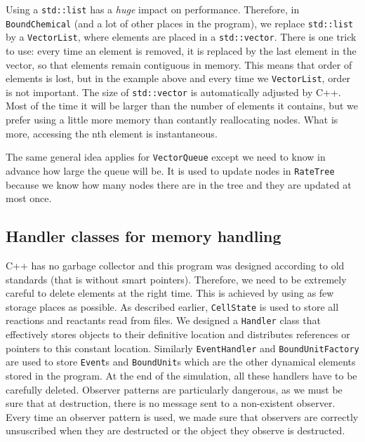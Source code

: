 Using a \texttt{std::list} has a \emph{huge} impact on performance. Therefore, in \texttt{BoundChemical} (and a lot of other places in the program), we replace \texttt{std::list} by a \texttt{VectorList}, where elements are placed in a \texttt{std::vector}. There is one trick to use: every time an element is removed, it is replaced by the last element in the vector, so that elements remain contiguous in memory. This means that order of elements is lost, but in the example above and every time we \texttt{VectorList}, order is not important. The size of \texttt{std::vector} is automatically adjusted by C++. Most of the time it will be larger than the number of elements it contains, but we prefer using a little more memory than contantly reallocating nodes. What is more, accessing the nth element is instantaneous.

The same general idea applies for \texttt{VectorQueue} except we need to know in advance how large the queue will be. It is used to update nodes in \texttt{RateTree} because we know how many nodes there are in the tree and they are updated at most once.

\subsection{Handler classes for memory handling}

C++ has no garbage collector and this program was designed according to old standards (that is without smart pointers). Therefore, we need to be extremely careful to delete elements at the right time. This is achieved by using as few storage places as possible. As described earlier, \texttt{CellState} is used to store all reactions and reactants read from files. We designed a \texttt{Handler} class that effectively stores objects to their definitive location and distributes references or pointers to this constant location. Similarly \texttt{EventHandler} and \texttt{BoundUnitFactory} are used to store \texttt{Event}s and \texttt{BoundUnit}s which are the other dynamical elements stored in the program. At the end of the simulation, all these handlers have to be carefully deleted. Observer patterns are particularly dangerous, as we must be sure that at destruction, there is no message sent to a non-existent observer. Every time an observer pattern is used, we made sure that observers are correctly unsuscribed when they are destructed or the object they observe is destructed.
